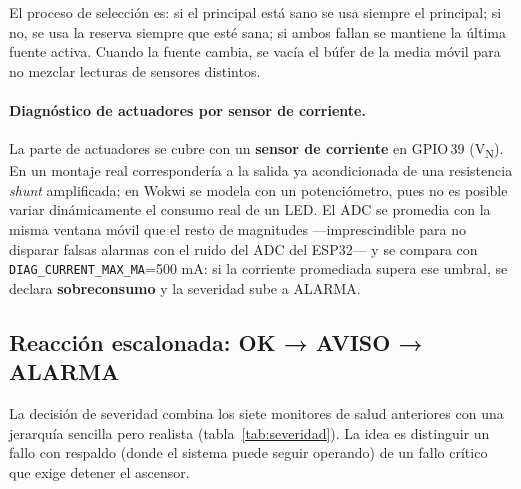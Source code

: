 El proceso de selección es: si el principal está sano se usa siempre el
principal; si no, se usa la reserva siempre que esté sana; si ambos fallan
se mantiene la última fuente activa. Cuando la fuente cambia, se vacía el
búfer de la media móvil para no mezclar lecturas de sensores distintos.

\paragraph{Diagnóstico de actuadores por sensor de corriente.}\label{sub:corriente}

La parte de actuadores se cubre con un \textbf{sensor de corriente} en
GPIO\,39 (V\textsubscript{N}). En un montaje real correspondería a la salida
ya acondicionada de una resistencia \emph{shunt} amplificada; en Wokwi se
modela con un potenciómetro, pues no es posible variar dinámicamente el
consumo real de un LED. El ADC se promedia con la misma ventana móvil que el
resto de magnitudes ---imprescindible para no disparar falsas alarmas con el
ruido del ADC del ESP32--- y se compara con
\texttt{DIAG\_CURRENT\_MAX\_MA}=500 mA: si la corriente
promediada supera ese umbral, se declara \textbf{sobreconsumo} y la
severidad sube a \textsf{ALARMA}.

\subsection{Reacción escalonada: OK → AVISO → ALARMA}\label{sub:severidad}

La decisión de severidad combina los siete monitores de salud anteriores con
una jerarquía sencilla pero realista (tabla~\ref{tab:severidad}). La idea es
distinguir un fallo con respaldo (donde el sistema puede seguir operando) de
un fallo crítico que exige detener el ascensor.

